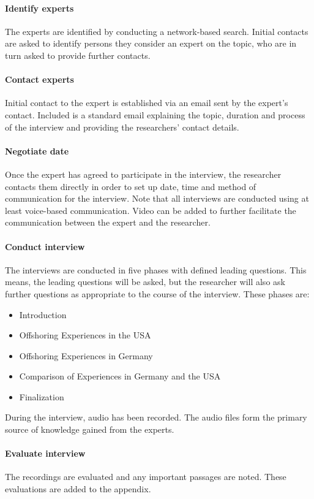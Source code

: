\paragraph{Identify experts} The experts are identified by conducting a network-based search. Initial contacts are asked to identify persons they consider an expert on the topic, who are in turn asked to provide further contacts.
\paragraph{Contact experts} Initial contact to the expert is established via an email sent by the expert's contact. Included is a standard email explaining the topic, duration and process of the interview and providing the researchers' contact details.
\paragraph{Negotiate date} Once the expert has agreed to participate in the interview, the researcher contacts them directly in order to set up date, time and method of communication for the interview. Note that all interviews are conducted using at least voice-based communication. Video can be added to further facilitate the communication between the expert and the researcher.
\paragraph{Conduct interview} The interviews are conducted in five phases with defined leading questions. This means, the leading questions will be asked, but the researcher will also ask further questions as appropriate to the course of the interview. These phases are:
\begin{itemize}
	\item Introduction
	\item Offshoring Experiences in the USA
	\item Offshoring Experiences in Germany
	\item Comparison of Experiences in Germany and the USA
	\item Finalization
\end{itemize}
During the interview, audio has been recorded. The audio files form the primary source of knowledge gained from the experts.


\paragraph{Evaluate interview} The recordings are evaluated and any important passages are noted. These evaluations are added to the appendix.


